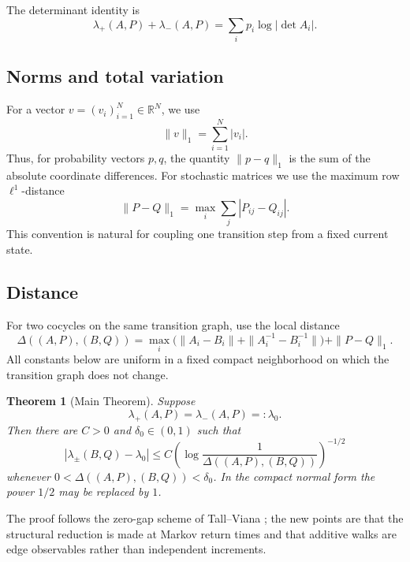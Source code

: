 \documentclass[11pt,a4paper]{amsart}
\newtheorem*{theoremA}{Theorem}
\theoremstyle{definition}
\theoremstyle{remark}
\numberwithin{equation}{section}
\newcommand{\RR}{\mathbb R}
\newcommand{\1}{\boldsymbol 1}
\begin{document}
The determinant identity is
\begin{equation}\label{eq:det-identity}
 \lambda_+(A,P)+\lambda_-(A,P)
 =\sum_i p_i\log|\det A_i|.
\end{equation}


\subsection{Norms and total variation}

For a vector $v=(v_i)_{i=1}^N\in\RR^N$, we use
\begin{equation}\label{eq:l1-vector}
 \|v\|_1=\sum_{i=1}^N|v_i|.
\end{equation}
Thus, for probability vectors $p,q$, the quantity $\|p-q\|_1$ is
the sum of the absolute coordinate differences.  For stochastic
matrices we use the maximum row $\ell^1$-distance
\begin{equation}\label{eq:l1-matrix}
 \|P-Q\|_1=\max_i\sum_j|P_{ij}-Q_{ij}|.
\end{equation}
This convention is natural for coupling one transition step from a
fixed current state.

\subsection{Distance}

For two cocycles on the same transition graph, use the local distance
\begin{equation}\label{eq:distance}
 \Delta((A,P),(B,Q))=
 \max_i\bigl(\|A_i-B_i\|+\|A_i^{-1}-B_i^{-1}\|\bigr)
 +\|P-Q\|_1.
\end{equation}
All constants below are uniform in a fixed compact neighborhood on which
the transition graph does not change.


\begin{theoremA}[Main Theorem]
Suppose
$$
 \lambda_+(A,P)=\lambda_-(A,P)=:\lambda_0.
$$
Then there are $C>0$ and $\delta_0\in(0,1)$ such that
\begin{equation}\label{eq:main-logholder}
 |\lambda_\pm(B,Q)-\lambda_0|
 \le C\left(\log\frac1{\Delta((A,P),(B,Q))}\right)^{-1/2}
\end{equation}
whenever $0<\Delta((A,P),(B,Q))<\delta_0$.  In the compact normal
form the power $1/2$ may be replaced by $1$.
\end{theoremA}

The proof follows the zero-gap scheme of Tall--Viana \cite{TV}; the new
points are that the structural reduction is made at Markov return times
and that additive walks are edge observables rather than independent
increments.
\end{document}
